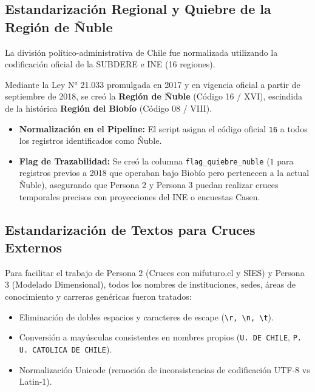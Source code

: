 \documentclass[11pt,a4paper]{article}
\begin{document}
\subsection{Estandarización Regional y Quiebre de la Región de Ñuble}
La división político-administrativa de Chile fue normalizada utilizando la codificación oficial de la SUBDERE e INE (16 regiones).
\begin{tcolorbox}[colback=white, colframe=primaryblue, title=\textbf{Tratamiento del Quiebre Histórico: Creación de la Región de Ñuble (2018)}]
Mediante la Ley N° 21.033 promulgada en 2017 y en vigencia oficial a partir de septiembre de 2018, se creó la \textbf{Región de Ñuble} (Código 16 / XVI), escindida de la histórica \textbf{Región del Biobío} (Código 08 / VIII).
\begin{itemize}
    \item \textbf{Normalización en el Pipeline:} El script asigna el código oficial \texttt{16} a todos los registros identificados como Ñuble.
    \item \textbf{Flag de Trazabilidad:} Se creó la columna \texttt{flag\_quiebre\_nuble} ($1$ para registros previos a 2018 que operaban bajo Biobío pero pertenecen a la actual Ñuble), asegurando que Persona 2 y Persona 3 puedan realizar cruces temporales precisos con proyecciones del INE o encuestas Casen.
\end{itemize}
\end{tcolorbox}

\subsection{Estandarización de Textos para Cruces Externos}
Para facilitar el trabajo de Persona 2 (Cruces con mifuturo.cl y SIES) y Persona 3 (Modelado Dimensional), todos los nombres de instituciones, sedes, áreas de conocimiento y carreras genéricas fueron tratados:
\begin{itemize}
    \item Eliminación de dobles espacios y caracteres de escape (\texttt{\textbackslash r, \textbackslash n, \textbackslash t}).
    \item Conversión a mayúsculas consistentes en nombres propios (\texttt{U. DE CHILE}, \texttt{P. U. CATOLICA DE CHILE}).
    \item Normalización Unicode (remoción de inconsistencias de codificación UTF-8 vs Latin-1).
\end{itemize}

\end{document}
